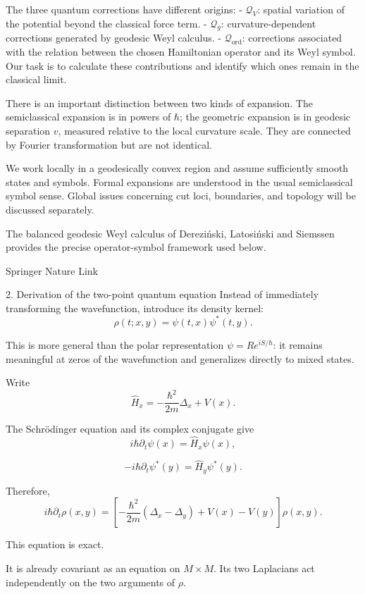 The three quantum corrections have different origins:
- \(\mathcal Q_V\): spatial variation of the potential beyond the classical force term.
- \(\mathcal Q_g\): curvature-dependent corrections generated by geodesic Weyl calculus.
- \(\mathcal Q_{\mathrm{ord}}\): corrections associated with the relation between the chosen Hamiltonian operator and its Weyl symbol.
Our task is to calculate these contributions and identify which ones remain in the classical limit.

There is an important distinction between two kinds of expansion. The semiclassical expansion is in powers of \(\hbar\); the geometric expansion is in geodesic separation \(v\), measured relative to the local curvature scale. They are connected by Fourier transformation but are not identical.

We work locally in a geodesically convex region and assume sufficiently smooth states and symbols. Formal expansions are understood in the usual semiclassical symbol sense. Global issues concerning cut loci, boundaries, and topology will be discussed separately.

The balanced geodesic Weyl calculus of Dereziński, Latosiński and Siemssen provides the precise operator-symbol framework used below. 

Springer Nature Link




2. Derivation of the two-point quantum equation
Instead of immediately transforming the wavefunction, introduce its density kernel:
\[
\rho(t;x,y)=\psi(t,x)\psi^*(t,y).
\tag{4}
\]

This is more general than the polar representation \(\psi=Re^{iS/\hbar}\): it remains meaningful at zeros of the wavefunction and generalizes directly to mixed states.

Write
\[
\widehat H_x=-\frac{\hbar^2}{2m}\Delta_x+V(x).
\]

The Schrödinger equation and its complex conjugate give
\[
i\hbar\partial_t\psi(x)=\widehat H_x\psi(x),
\]

\[
-i\hbar\partial_t\psi^*(y)=\widehat H_y\psi^*(y).
\]

Therefore,
\[
\boxed{
i\hbar\partial_t\rho(x,y)
=
\left[
-\frac{\hbar^2}{2m}(\Delta_x-\Delta_y)
+V(x)-V(y)
\right]\rho(x,y).
}
\tag{5}
\]

This equation is exact.

It is already covariant as an equation on \(M\times M\). Its two Laplacians act independently on the two arguments of \(\rho\).

